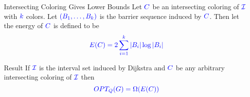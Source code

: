 \documentclass[10pt, handout]{beamer}
\begin{document}
\begin{frame}{Intersecting Coloring Gives Lower Bounds}
	Let $\mathcolor{blue}{C}$ be an intersecting coloring of $\mathcolor{blue}{\mathcal{I}}$ with $\mathcolor{blue}{k}$ colors.
	Let $\mathcolor{blue}{(B_1,\dots, B_k)}$ is the barrier sequence induced by $\mathcolor{blue}{C}$. Then let the energy of $\mathcolor{blue}{C}$ is defined to be $$\mathcolor{blue}{E(C)=2\sum\limits_{i=1}^k|B_i|\log |B_i|}$$\pause
	\vfill

	\begin{alertblock}{Result}
		If $\mathcolor{blue}{\mathcal{I}}$ is the interval set induced by Dijkstra and $\mathcolor{blue}{C}$ be any arbitrary intersecting coloring of $\mathcolor{blue}{\mathcal{I}}$ then $$\mathcolor{blue}{OPT_Q(G)=\Omega(E(C))}$$
	\end{alertblock}
\end{frame}
\end{document}
